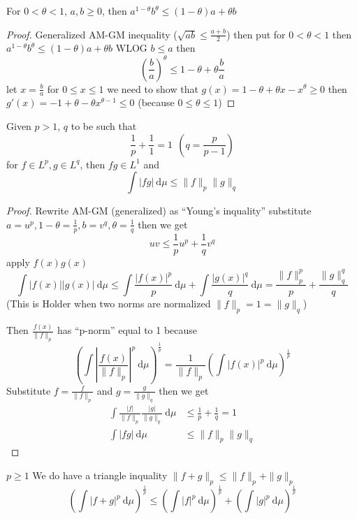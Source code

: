 \begin{claim}
  For $0 < \theta < 1$, $a, b \ge 0$, then $a^{1-\theta}b^\theta \le (1-\theta)a + \theta b$
\end{claim}

\begin{proof}
  Generalized AM-GM inequality ($\sqrt{ab}\le \frac{a+b}{2}$)
  then put for $0 < \theta < 1$ then $a^{1 -\theta}b^\theta \le (1-\theta)a + \theta b$ 
  WLOG $b \le a$ then \[\left(\frac ba\right)^\theta \le 1 - \theta + \theta\frac ba\]
  let $x = \frac ba$ for $0 \le x \le 1$ we need to show that $g(x) = 1- \theta + \theta x - x^\theta \ge 0$
  then $g'(x) = -1 + \theta -\theta x^{\theta - 1} \le 0$ (because $0 \le \theta \le 1$)
\end{proof}

\begin{claim}
  Given $p > 1$, $q$ to be such that 
  \[\frac1{p}+\frac11 = 1\ \ \left(q = \frac p{p-1}\right)\]
  for $f \in L^p, g \in L^{q}$, then $fg \in L^1$ and
  \[\int |fg| \ \mathrm{d}\mu \le \|f\|_p\|g\|_{q}\]
\end{claim}

\begin{proof}
  Rewrite AM-GM (generalized) as ``Young's inquality'' substitute $a = u^p, 1-\theta = \frac1p, b = v^{q}, \theta = \frac1{q}$
  then we get 
  \[uv \le \frac1pu^p + \frac1{q}v^{q}\]
  apply $f(x)g(x)$
  \[\int |f(x)||g(x)|\ \mathrm{d}\mu \le \int \frac{|f(x)|^p}{p} \ \mathrm{d}\mu + \int \frac{|g(x)|^{q}}{q}\ \mathrm{d}\mu = \frac{\|f\|_p^p}{p} + \frac{\|g\|_{q}^{q}}{q}\]
  (This is Holder when two norms are normalized $\|f\|_p = 1 = \|g\|_{q}$)

  Then $\frac{f(x)}{\|f\|_p}$ has ``p-norm'' equal to 1 because
  \[\left(\int \left|\frac{f(x)}{\|f\|_p}\right|^p \ \mathrm{d}\mu\right)^{\frac1p} = \frac{1}{\|f\|_p}\left(\int |f(x)|^p \ \mathrm{d}\mu\right)^{\frac1p}\]
  Substitute $f = \frac{f}{\|f\|_p}$ and $g = \frac{g}{\|g\|_{q}}$ then we get
  \begin{align*}
    \int \frac{|f|}{\|f\|_p}\frac{|g|}{\|g\|_{q}} \ \mathrm{d}\mu  &\le \frac1p + \frac1q = 1 \\
    \int |fg| \ \mathrm{d}\mu &\le \|f\|_p\|g\|_{q} 
  \end{align*}

\end{proof}
  
\begin{theorem}
  $p \ge 1$
  We do have a triangle inquality $\|f + g\|_p \le \|f\|_p + \|g\|_p$
  \[\left(\int |f+g|^p\ \mathrm{d}\mu \right)^{\frac1p} \le \left(\int |f|^p\ \mathrm{d}\mu\right)^{\frac1p} + \left(\int |g|^p \ \mathrm{d}\mu\right)^{\frac1p}\]
\end{theorem}

